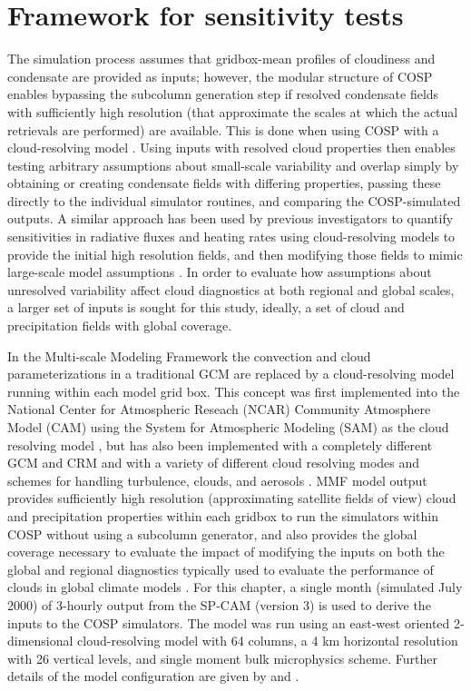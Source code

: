 \section{Framework for sensitivity tests}\label{sec:subgrid1Framework}

The simulation process assumes that gridbox-mean profiles of cloudiness
and condensate are provided as inputs; however, the modular structure of
COSP enables bypassing the subcolumn generation step if resolved
condensate fields with sufficiently high resolution (that approximate
the scales at which the actual retrievals are performed) are available.
This is done when using COSP with a cloud-resolving model
\citep{marchand_et_al_2009, marchand_and_ackerman_2010}. Using inputs
with resolved cloud properties then enables testing arbitrary
assumptions about small-scale variability and overlap simply by
obtaining or creating condensate fields with differing properties,
passing these directly to the individual simulator routines, and
comparing the COSP-simulated outputs. A similar approach has been used
by previous investigators to quantify sensitivities in radiative fluxes
and heating rates using cloud-resolving models to provide the initial
high resolution fields, and then modifying those fields to mimic
large-scale model assumptions
\citep{barker_et_al_1999, wu_and_liang_2005}. In order to evaluate how
assumptions about unresolved variability affect cloud diagnostics at
both regional and global scales, a larger set of inputs is sought for
this study, ideally, a set of cloud and precipitation fields with global
coverage.

In the Multi-scale Modeling Framework \citep[MMF;][]{randall_et_al_2003}
the convection and cloud parameterizations in a traditional GCM are
replaced by a cloud-resolving model running within each model grid box.
This concept was first implemented into the National Center for
Atmospheric Reseach (NCAR) Community Atmosphere Model (CAM) using the
System for Atmospheric Modeling (SAM) as the cloud resolving model
\citep[SP-CAM;][]{khairoutdinov_and_randall_2001}, but has also been
implemented with a completely different GCM and CRM
\citep{tao_et_al_2009} and with a variety of different cloud resolving
modes and schemes for handling turbulence, clouds, and aerosols
\citep[e.g.,][]{cheng_and_xu_2011, cheng_and_xu_2013}. MMF model output
provides sufficiently high resolution (approximating satellite fields of
view) cloud and precipitation properties within each gridbox to run the
simulators within COSP without using a subcolumn generator, and also
provides the global coverage necessary to evaluate the impact of
modifying the inputs on both the global and regional diagnostics
typically used to evaluate the performance of clouds in global climate
models \citep[e.g.,][]{gleckler_et_al_2008}. For this chapter, a single
month (simulated July 2000) of 3-hourly output from the SP-CAM (version
3) is used to derive the inputs to the COSP simulators. The model was
run using an east-west oriented 2-dimensional cloud-resolving model with
64 columns, a 4 km horizontal resolution with 26 vertical levels, and
single moment bulk microphysics scheme. Further details of the model
configuration are given by \citet{khairoutdinov_et_al_2005} and
\citet{marchand_et_al_2009}.

